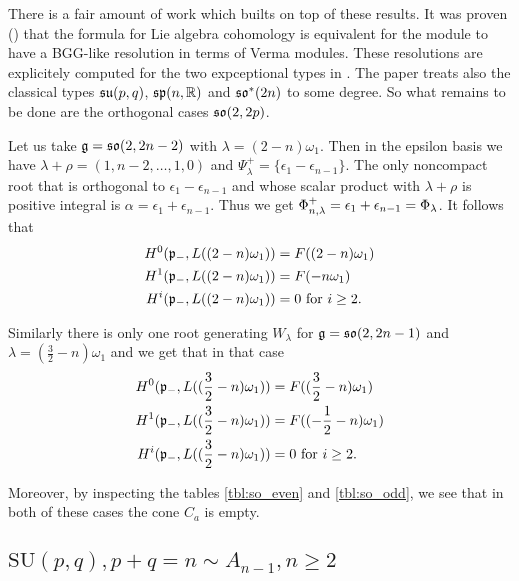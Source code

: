 There is a fair amount of work which builts on top of these results. It was proven (\cite{enright_hilbert_2004,boe_kostant_2009}) that the formula for Lie algebra cohomology is equivalent for the module to have a BGG-like resolution in terms of Verma modules. These resolutions are explicitely computed for the two expceptional types in \cite{enright_resolutions_2004}. The paper \cite{enright_hilbert_2004} treats also the classical types $\mathfrak{su}(p,q)$, $\mathfrak{sp}(n,\mathbb{R})$ and $\mathfrak{so}^*(2n)$ to some degree. So what remains to be done are the orthogonal cases $\mathfrak{so}(2,2p)$. 

\begin{example} 
 Let us take $\mathfrak{g} = \mathfrak{so}(2,2n-2)$ with $\lambda = (2-n)\omega_1$. Then in the epsilon basis we have $\lambda + \rho = (1,n-2,\ldots,1,0)$ and $\Psi_\lambda^+ = \{ \epsilon_1 - \epsilon_{n-1}\}$. The only noncompact root that is orthogonal to $\epsilon_1 -  \epsilon_{n-1}$ and whose scalar product with $\lambda + \rho$ is positive integral is $\alpha = \epsilon_1 + \epsilon_{n-1}$. Thus we get $\Phi_{n,\lambda}^+ = \epsilon_1 + \epsilon_{n-1} = \Phi_\lambda$. It follows that
\begin{align*}
 H^0(\mathfrak{p}_-,L((2-n)\omega_1)) &= F((2-n)\omega_1)\\
 H^1(\mathfrak{p}_-,L((2-n)\omega_1)) &= F(-n\omega_1)\\
 H^i(\mathfrak{p}_-,L((2-n)\omega_1)) &= 0 \text{ for } i\geq 2.
\end{align*} 

Similarly there is only one root generating $W_\lambda$ for $\mathfrak{g} = \mathfrak{so}(2,2n-1)$ and $\lambda = (\frac{3}{2} - n)\omega_1$ and we get that in that case
\begin{align*}
 H^0(\mathfrak{p}_-,L((\frac{3}{2}-n)\omega_1)) &= F((\frac{3}{2}-n)\omega_1)\\
 H^1(\mathfrak{p}_-,L((\frac{3}{2}-n)\omega_1)) &= F((-\frac{1}{2}-n)\omega_1)\\
 H^i(\mathfrak{p}_-,L((\frac{3}{2}-n)\omega_1)) &= 0 \text{ for } i\geq 2.
\end{align*}

Moreover, by inspecting the tables \ref{tbl:so_even} and \ref{tbl:so_odd}, we see that in both of these cases the cone $C_a$ is empty.
\end{example}


\clearpage

\subsection[SU(p,q)]{$\mathrm{SU}(p,q), p+q=n \sim A_{n-1}, n \geq 2$}\label{sec:su}

